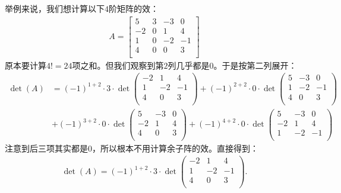 \documentclass[12pt,UTF8,fontset=none]{ctexbook}
\begin{document}
举例来说，我们想计算以下$4$阶矩阵的效：
\begin{align*}
    A = \begin{bmatrix}
        5    & 3  & -3 & 0 \\
        -2   & 0   & 1 & 4 \\
        1     & 0    & -2 & -1  \\
        4    & 0   & 0 & 3 \\
       \end{bmatrix}
\end{align*}
原本要计算$4!= 24$项之和。但我们观察到第$2$列几乎都是$0$。于是按第二列展开：
\begin{align*}
    \det(A) &= (-1)^{1+2} \cdot 3\cdot \det\begin{pmatrix}
        -2      & 1 & 4 \\
        1        & -2 & -1  \\
        4       & 0 & 3 \\
       \end{pmatrix}
       + (-1)^{2+2} \cdot 0\cdot \det\begin{pmatrix}
        5     & -3 & 0 \\
        1    & -2 & -1  \\
        4    & 0 & 3 \\
       \end{pmatrix}
       \\
       &+ (-1)^{3+2} \cdot 0\cdot \det\begin{pmatrix}
        5     & -3 & 0 \\
        -2    & 1 & 4 \\
        4    & 0 & 3 \\
       \end{pmatrix}+ (-1)^{4+2} \cdot 0\cdot \det\begin{pmatrix}
        5    & -3 & 0 \\
        -2    & 1 & 4 \\
        1    & -2 & -1  \\
       \end{pmatrix}
\end{align*}
注意到后三项其实都是$0$，所以根本不用计算余子阵的效。直接得到：
\begin{align*}
    \det(A) = (-1)^{1+2} \cdot 3\cdot \det\begin{pmatrix}
        -2      & 1 & 4 \\
        1        & -2 & -1  \\
        4       & 0 & 3 \\
       \end{pmatrix}.
\end{align*}
\end{document}
